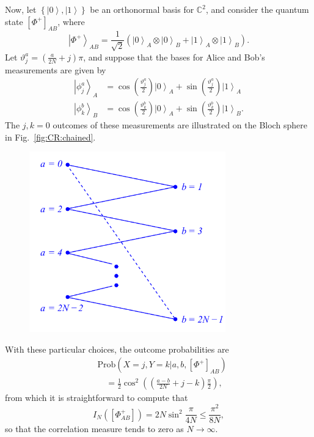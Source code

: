 \documentclass[DIV=calc,paper=a4,fontsize=11pt,twocolumn]{scrartcl} %
\theoremstyle{definition}
\theoremstyle{plain}
\newcommand{\Ket}[1]{\ensuremath{\left \vert #1 \right \rangle}}
\newcommand{\Proj}[1]{\ensuremath{\left [ #1 \right ]}}
\begin{document}
Now, let $\left \{ \Ket{0}, \Ket{1} \right \}$ be an orthonormal basis
for $\mathbb{C}^2$, and consider the quantum state
$\Proj{\Phi^+}_{AB}$, where
\begin{equation}
\Ket{\Phi^+}_{AB} = \frac{1}{\sqrt{2}} \left ( \Ket{0}_A \otimes \Ket{0}_B
+ \Ket{1}_A \otimes \Ket{1}_B \right ).
\end{equation}
Let $\vartheta^a_j = \left ( \frac{a}{2N} + j\right ) \pi$, and
suppose that the bases for Alice and Bob's measurements are given by
\begin{align}
\Ket{\phi^a_j}_A & = \cos \left ( \frac{\vartheta^a_j}{2} \right )
\Ket{0}_A + \sin \left ( \frac{\vartheta^a_j}{2} \right
) \Ket{1}_A \\
\Ket{\phi^b_k}_B & = \cos \left ( \frac{\vartheta^b_k}{2} \right )
\Ket{0}_A + \sin \left ( \frac{\vartheta^b_k}{2} \right ) \Ket{1}_B.
\end{align}
The $j,k=0$ outcomes of these measurements are illustrated on the
Bloch sphere in Fig.~\ref{fig:CR:chained}.
\begin{figure}[t!]
\centering
\includegraphics[width=85mm]{Fig14.pdf}
\caption{}
\end{figure}

With these particular choices, the outcome probabilities are
\begin{align}
&\text{Prob} \left ( X = j,Y = k|a,b,\Proj{\Phi^+}_{AB}\right ) \nonumber\\
&\quad= \frac{1}{2}
\cos^2 \left ( \left ( \frac{a-b}{2N} + j - k \right ) \frac{\pi}{2}
\right ),
\end{align}
from which it is straightforward to compute that
\begin{equation}
\label{eq:CR:corval}
I_N(\Proj{\Phi^+_{AB}}) = 2N \sin^2 \frac{\pi}{4N} \leq
\frac{\pi^2}{8N} ,
\end{equation}
so that the correlation measure tends to zero as $N \rightarrow
\infty$.
\end{document}
